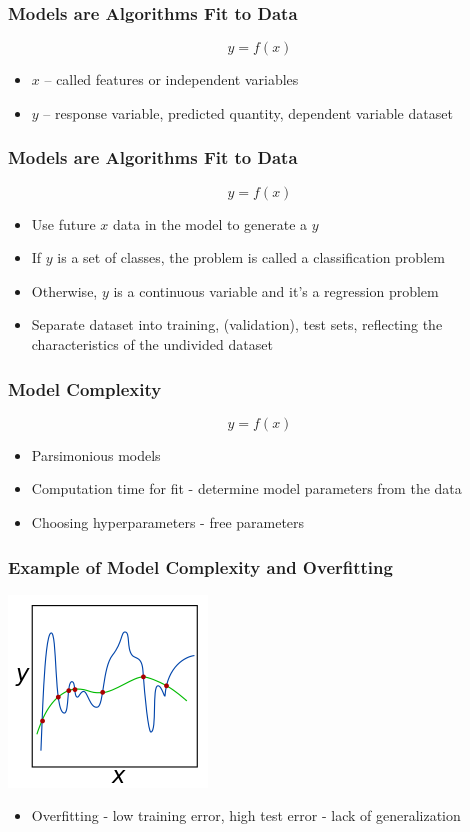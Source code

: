 \documentclass{beamer}
\begin{document}

\begin{frame}
\frametitle{Models are Algorithms Fit to Data}
\begin{equation}
y = f(x)
\end{equation}
\begin{itemize}
\item $x$ -- called features or independent variables
\item $y$ -- response variable, predicted quantity, dependent variable
dataset
\end{itemize}
\end{frame}

\begin{frame}
\frametitle{Models are Algorithms Fit to Data}
\begin{equation}
y = f(x)
\end{equation}
\begin{itemize}
\item Use future $x$ data in the model to generate a $y$
\item If $y$ is a set of classes, the problem is called a classification problem
\item Otherwise, $y$ is a continuous variable and it's a regression problem
\item Separate dataset into training, (validation), test sets, reflecting the characteristics of the undivided dataset \end{itemize}
\end{frame}

\begin{frame}
\frametitle{Model Complexity}
\begin{equation}
y = f(x)
\end{equation}
\begin{itemize}
\item Parsimonious models
\item Computation time for fit - determine model parameters from the data
\item Choosing hyperparameters - free parameters 
\end{itemize}
\end{frame}

\begin{frame}
\frametitle{Example of Model Complexity and Overfitting}
\includegraphics{overfit}
\begin{itemize}
\item Overfitting - low training error, high test error - lack of generalization
\end{itemize}
\end{frame}
\end{document}
